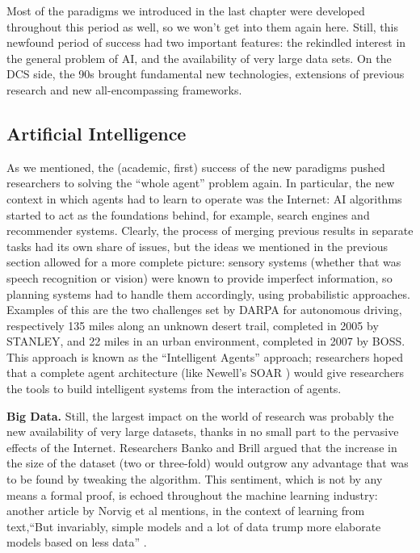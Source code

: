 \documentclass[../main.tex]{subfiles}
\begin{document}
Most of the paradigms we introduced in the last chapter were developed throughout this period as well, so we won't get into them again here. Still, this newfound period of success had two important features: the rekindled interest in the general problem of AI, and the availability of very large data sets. On the DCS side, the 90s brought fundamental new technologies, extensions of previous research and new all-encompassing frameworks.

\subsection{Artificial Intelligence}
As we mentioned, the (academic, first) success of the new paradigms pushed researchers to solving the ``whole agent'' problem again. In particular, the new context in which agents had to learn to operate was the Internet: AI algorithms started to act as the foundations behind, for example, search engines and recommender systems. Clearly, the process of merging previous results in separate tasks had its own share of issues, but the ideas we mentioned in the previous section allowed for a more complete picture: sensory systems (whether that was speech recognition or vision) were known to provide imperfect information, so planning systems had to handle them accordingly, using probabilistic approaches. Examples of this are the two challenges set by DARPA for autonomous driving, respectively 135 miles along an unknown desert trail, completed in 2005 by STANLEY, and 22 miles in an urban environment, completed in 2007 by BOSS. This approach is known as the ``Intelligent Agents'' approach; researchers hoped that a complete agent architecture (like Newell's SOAR \parencite{pressSoarCognitiveArchitecture2012}) would give researchers the tools to build intelligent systems from the interaction of agents.

\vspace{4pt}
\textbf{Big Data.} 
Still, the largest impact on the world of research was probably the new availability of very large datasets, thanks in no small part to the pervasive effects of the Internet. Researchers Banko and Brill \parencite{bankoScalingVeryVery2001} argued that the increase in the size of the dataset (two or three-fold) would outgrow any advantage that was to be found by tweaking the algorithm. This sentiment, which is not by any means a formal proof, is echoed throughout the machine learning industry: another article by Norvig et al mentions, in the context of learning from text,\enquote{But invariably, simple models and a lot of data trump more elaborate models based on less data} \parencite{halevyUnreasonableEffectivenessData2009}.
\end{document}
